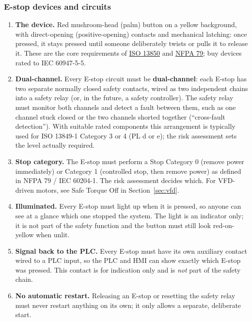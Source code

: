 \subsubsection*{E-stop devices and circuits}
\begin{enumerate}[itemsep=2pt]
  \item \textbf{The device.} Red mushroom-head (palm) button on a yellow background, with direct-opening (positive-opening) contacts and mechanical latching: once pressed, it stays pressed until someone deliberately twists or pulls it to release it. These are the core requirements of \href{https://machinerysafety101.com/2026/05/18/iso-13850-emergency-stop-requirements/}{ISO 13850} and \href{https://link.nfpa.org/all-publications/79/2024}{NFPA 79}; buy devices rated to IEC 60947-5-5.
  \item \textbf{Dual-channel.} Every E-stop circuit must be \textbf{dual-channel}: each E-stop has two separate normally closed safety contacts, wired as two independent chains into a safety relay (or, in the future, a safety controller). The safety relay must monitor both channels and detect a fault between them, such as one channel stuck closed or the two channels shorted together (``cross-fault detection''). With suitable rated components this arrangement is typically used for ISO 13849-1 Category 3 or 4 (PL d or e); the risk assessment sets the level actually required.
  \item \textbf{Stop category.} The E-stop must perform a Stop Category 0 (remove power immediately) or Category 1 (controlled stop, then remove power) as defined in NFPA 79 / IEC 60204-1. The risk assessment decides which. For VFD-driven motors, see Safe Torque Off in Section~\ref{sec:vfd}.
  \item \textbf{Illuminated.} Every E-stop must light up when it is pressed, so anyone can see at a glance which one stopped the system. The light is an indicator only; it is not part of the safety function and the button must still look red-on-yellow when unlit.
  \item \textbf{Signal back to the PLC.} Every E-stop must have its own auxiliary contact wired to a PLC input, so the PLC and HMI can show exactly which E-stop was pressed. This contact is for indication only and is \emph{not} part of the safety chain.
  \item \textbf{No automatic restart.} Releasing an E-stop or resetting the safety relay must never restart anything on its own; it only allows a separate, deliberate start.
\end{enumerate}

